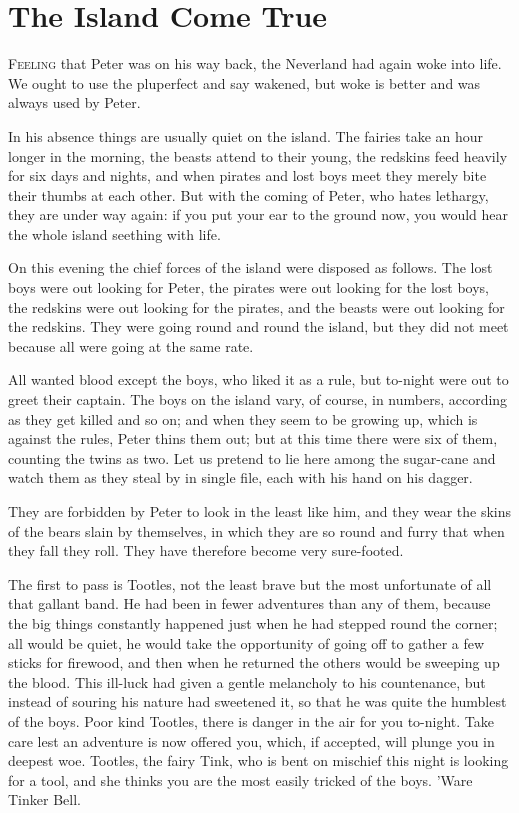 \chapter{The Island Come True}

\lettrine{F}{eeling} that Peter was on his way back, the Neverland had again woke into life.
We ought to use the pluperfect and say wakened, but woke is better and was
always used by Peter.

In his absence things are usually quiet on the island.
The fairies take an hour longer in the morning, the beasts attend to their
young, the redskins feed heavily for six days and nights, and when pirates and
lost boys meet they merely bite their thumbs at each other.
But with the coming of Peter, who hates lethargy, they are under way again: if
you put your ear to the ground now, you would hear the whole island seething
with life.

On this evening the chief forces of the island were disposed as follows.
The lost boys were out looking for Peter, the pirates were out looking for the
lost boys, the redskins were out looking for the pirates, and the beasts were
out looking for the redskins.
They were going round and round the island, but they did not meet because all
were going at the same rate.

All wanted blood except the boys, who liked it as a rule, but to-night were out
to greet their captain.
The boys on the island vary, of course, in numbers, according as they get killed
and so on; and when they seem to be growing up, which is against the rules,
Peter thins them out; but at this time there were six of them, counting the
twins as two.
Let us pretend to lie here among the sugar-cane and watch them as they steal by
in single file, each with his hand on his dagger.

They are forbidden by Peter to look in the least like him, and they wear the
skins of the bears slain by themselves, in which they are so round and furry
that when they fall they roll.
They have therefore become very sure-footed.

The first to pass is Tootles, not the least brave but the most unfortunate of
all that gallant band.
He had been in fewer adventures than any of them, because the big things
constantly happened just when he had stepped round the corner; all would be
quiet, he would take the opportunity of going off to gather a few sticks for
firewood, and then when he returned the others would be sweeping up the blood.
This ill-luck had given a gentle melancholy to his countenance, but instead of
souring his nature had sweetened it, so that he was quite the humblest of the
boys.
Poor kind Tootles, there is danger in the air for you to-night.
Take care lest an adventure is now offered you, which, if accepted, will plunge
you in deepest woe.
Tootles, the fairy Tink, who is bent on mischief this night is looking for a
tool, and she thinks you are the most easily tricked of the boys.
'Ware Tinker Bell.

